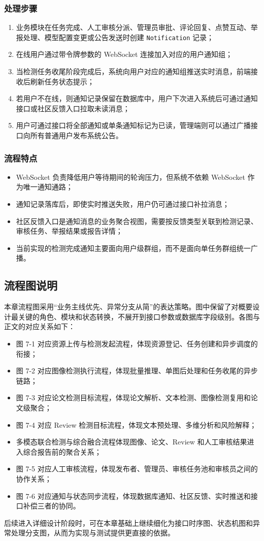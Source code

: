 \subsubsection{处理步骤}
\begin{enumerate}[leftmargin=2em]
    \item 业务模块在任务完成、人工审核分派、管理员审批、评论回复、点赞互动、举报处理、模型配置变更或公告发送时创建 \texttt{Notification} 记录；
    \item 在线用户通过带令牌参数的 WebSocket 连接加入对应的用户通知组；
    \item 当检测任务收尾阶段完成后，系统向用户对应的通知组推送实时消息，前端接收后刷新任务状态提示；
    \item 若用户不在线，则通知记录保留在数据库中，用户下次进入系统后可通过通知接口或社区反馈入口拉取未读消息；
    \item 用户可通过接口将全部通知或单条通知标记为已读，管理端则可以通过广播接口向所有普通用户发布系统公告。
\end{enumerate}

\subsubsection{流程特点}
\begin{itemize}[leftmargin=2em]
    \item WebSocket 负责降低用户等待期间的轮询压力，但系统不依赖 WebSocket 作为唯一通知通路；
    \item 通知记录落库后，即使实时推送失败，用户仍可通过接口补拉消息；
    \item 社区反馈入口是通知消息的业务聚合视图，需要按反馈类型关联到检测记录、审核任务、举报结果或报告详情；
    \item 当前实现的检测完成通知主要面向用户级群组，而不是面向单任务群组统一广播。
\end{itemize}

\subsection{流程图说明}
本章流程图采用“业务主线优先、异常分支从简”的表达策略。图中保留了对概要设计最关键的角色、模块和状态转换，不展开到接口参数或数据库字段级别。各图与正文的对应关系如下：
\begin{itemize}[leftmargin=2em]
    \item 图 7-1 对应资源上传与检测发起流程，体现资源登记、任务创建和异步调度的衔接；
    \item 图 7-2 对应图像检测执行流程，体现批量推理、单图后处理和任务收尾的异步链路；
    \item 图 7-3 对应论文检测目标流程，体现论文解析、文本检测、图像检测复用和论文级聚合；
    \item 图 7-4 对应 Review 检测目标流程，体现文本预处理、多维分析和风险解释；
    \item 多模态联合检测与综合融合流程体现图像、论文、Review 和人工审核结果进入综合报告前的聚合关系；
    \item 图 7-5 对应人工审核流程，体现发布者、管理员、审核任务池和审核员之间的协作关系；
    \item 图 7-6 对应通知与状态同步流程，体现数据库通知、社区反馈、实时推送和接口补偿三者的协同。
\end{itemize}

后续进入详细设计阶段时，可在本章基础上继续细化为接口时序图、状态机图和异常处理分支图，从而为实现与测试提供更直接的依据。
